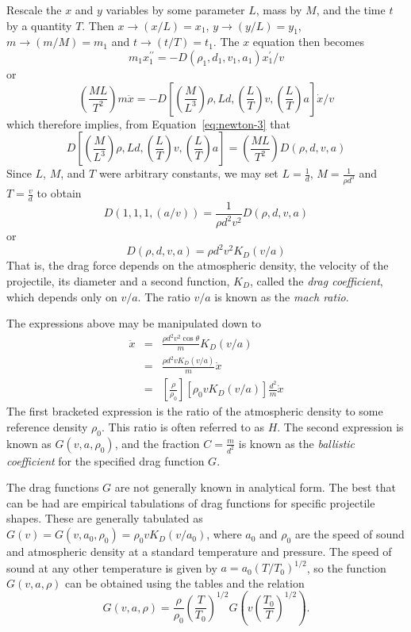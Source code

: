 \documentclass[12pt]{article}
\begin{document}
Rescale the $x$ and $y$ variables by some parameter $L$, mass by $M$,
and the time $t$ by a quantity $T$.  Then $x\rightarrow(x/L)=x_1$,
$y\rightarrow(y/L)=y_1$, $m\rightarrow(m/M)=m_1$ and
$t\rightarrow(t/T)=t_1$.  The $x$ equation then becomes
\begin{equation}
m_1x_1^{\prime\prime}=-D(\rho_1,d_1,v_1,a_1)x_1^{\prime}/v
\end{equation}
or
\begin{equation}
\left(\frac{ML}{T^2}\right)m\ddot{x}=-D\left[ \left(\frac {M}{L^3}\right)\rho,Ld,\left(\frac
LT\right)v,\left(\frac LT\right)a\right] \dot{x}/v
\end{equation}
which therefore implies, from Equation~\ref{eq:newton-3} that
\begin{equation}
D\left[\left(\frac {M}{L^3}\right)\rho,Ld,\left(\frac LT\right)v,\left(\frac LT\right)a\right]=\left(\frac
{ML}{T^2}\right) D(\rho,d,v,a)
\end{equation}
Since $L$, $M$, and $T$ were arbitrary constants, we may set $L=\frac
1d$, $M=\frac{1}{\rho d^3}$ and $T=\frac vd$ to obtain
\begin{equation}
D(1,1,1,(a/v))=\frac{1}{\rho d^2v^2}D(\rho,d,v,a)
\end{equation}
or
\begin{equation}
D(\rho,d,v,a)=\rho d^2v^2K_D(v/a)
\end{equation}
That is, the drag force depends on the atmospheric density, the
velocity of the projectile, its diameter and a second function, $K_D$,
called the {\em drag coefficient}, which depends only on $v/a$.  The
ratio $v/a$ is known as the {\em mach ratio}.

The expressions above may be manipulated down to  
\begin{eqnarray}
\ddot{x}&=&\frac{\rho d^2 v^2 \cos \theta}{m} K_D(v/a)\\
        &=& \frac{\rho d^2 v K_D(v/a)}{m} \dot{x} \\
        &=& \left[\frac {\rho}{\rho_0}\right] \left[ \rho_0 v K_D(v/a)
\right] \frac{d^2}{m} \dot{x}
\end{eqnarray}
The first bracketed expression is the ratio of the atmospheric density
to some reference density $\rho_0$. This ratio is often referred to as
$H$.  The second expression is known as $G(v,a,\rho_0)$, and the
fraction $C=\frac{m}{d^2}$ is known as the {\em ballistic coefficient}
for the specified drag function $G$.

The drag functions $G$ are not generally known in analytical form.
The best that can be had are empirical tabulations of drag functions
for specific projectile shapes.  These are generally tabulated as
$G(v)=G(v,a_0,\rho_0)=\rho_0 v K_D(v/a_0)$, where $a_0$ and $\rho_0$
are the speed of sound and atmospheric density at a standard
temperature and pressure.  The speed of sound at any other temperature
is given by $a=a_0 (T/T_0)^{1/2}$, so the function $G(v,a,\rho)$ can
be obtained using the tables and the relation
$$G(v,a,\rho)=\frac{\rho}{\rho_0}\left(\frac{T}{T_0}\right)^{1/2}
G(v\left(\frac{T_0}{T}\right)^{1/2}).$$
\end{document}
